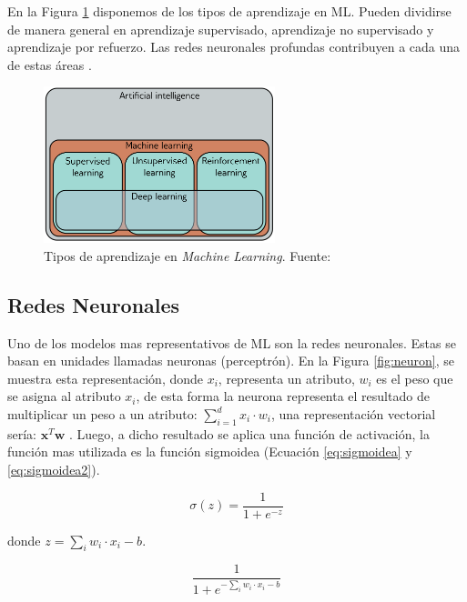 En la Figura \ref{fig:ml} disponemos de los tipos de aprendizaje en ML. Pueden dividirse de manera general en aprendizaje supervisado, aprendizaje no supervisado y aprendizaje por refuerzo. Las redes neuronales profundas contribuyen a cada una de estas áreas \cite{prince2023understanding}.

\begin{figure}[H]
	\centering
	\includegraphics[width=0.6\textwidth]{../img/theory/ml}	
	\caption{Tipos de aprendizaje en \textit{Machine Learning}. Fuente: \citep{prince2023understanding} }
	\label{fig:ml}
\end{figure}





\subsection{Redes Neuronales}

Uno  de los modelos mas representativos de ML son la redes neuronales. Estas se basan en unidades llamadas neuronas (perceptrón). En la Figura \ref{fig:neuron}, se muestra esta representación, donde $x_i$, representa un atributo, $w_i$ es el peso que se asigna al atributo $x_i$, de esta forma la neurona representa el resultado de multiplicar un peso a un atributo: $\sum_{i=1}^{d} x_i \cdot w_i$, una representación vectorial sería: $\textbf{x}^T\textbf{w}$ \citep{nielsen2015neural}. Luego, a dicho resultado se aplica una función de activación, la función mas utilizada es la función sigmoidea (Ecuación \ref{eq:sigmoidea} y \ref{eq:sigmoidea2}).  

\begin{equation}\label{eq:sigmoidea}
	\sigma (z) = \frac{1}{1 + e^{-z}}
\end{equation}

donde $z = \sum_{i}^{} w_i \cdot x_i - b$.

\begin{equation}\label{eq:sigmoidea2}
	\frac{1}{1 + e^{-\sum_{i}^{} w_i \cdot x_i - b}}
\end{equation}

